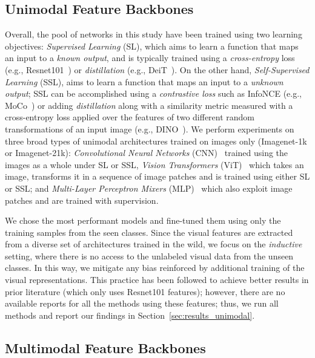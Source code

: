 \subsection{Unimodal Feature Backbones}




Overall, the pool of networks in this study have been trained using two learning objectives: 
\textit{Supervised Learning} (SL), which aims to learn a function that maps an input to a \textit{known output}, and is typically trained using a \textit{cross-entropy} loss (e.g., Resnet101~\cite{RNs}) or \textit{distillation} (e.g., DeiT~\cite{DeiT}). On the other hand, \textit{Self-Supervised Learning} (SSL), aims to learn a function that maps an input to a \textit{unknown output}; SSL can be accomplished using a \textit{contrastive loss} such as InfoNCE (e.g., MoCo~\cite{MoCo}) or adding \textit{distillation} along with a similarity metric measured with a cross-entropy loss applied over the features of two different random transformations of an input image (e.g., DINO~\cite{DINO}). 
We perform experiments on three broad types of unimodal architectures trained on images only (Imagenet-1k or Imagenet-21k):
\textit{Convolutional Neural Networks} (CNN)~\cite{Alexnet} trained using the images as a whole under SL or SSL, 
\textit{Vision Transformers} (ViT)~\cite{ViT} which takes an image, transforms it in a sequence of image patches and is trained using either SL or SSL; and
\textit{Multi-Layer Perceptron Mixers} (MLP)~\cite{MLPMixer} which also exploit image patches and are trained with supervision.

We chose the most performant models and fine-tuned them using only the training samples from the seen classes. Since the visual features are extracted from a diverse set of architectures trained in the wild, we focus on the \textit{inductive} setting, where there is no access to the unlabeled visual data from the unseen classes. In this way, we mitigate any bias reinforced by additional training of the visual representations. 
This practice has been followed to achieve better results in prior literature (which only uses Resnet101 features); however, there are no available reports for all the methods using these features; thus, we run all methods and report our findings in Section~\ref{sec:results_unimodal}.



\subsection{Multimodal Feature Backbones}

